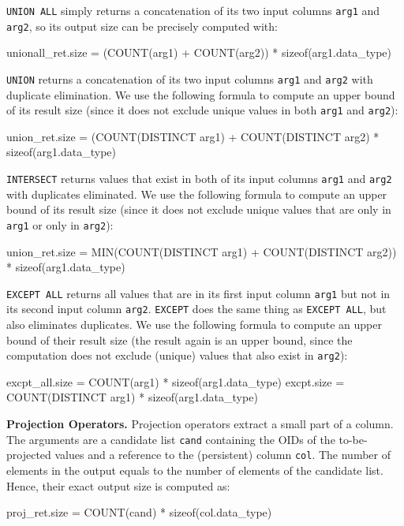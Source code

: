 \documentclass[conference]{IEEEtran}
\def\Skip{\par\medskip\nobreak\noindent}
\begin{document}
\texttt{\small UNION ALL} simply returns a concatenation of its two input columns \texttt{\small arg1} and \texttt{\small arg2}, so its output size can be precisely computed with:
\begin{verb}
unionall_ret.size = (COUNT(arg1) + COUNT(arg2)) * 
  sizeof(arg1.data_type)
\end{verb}

\texttt{\small UNION} returns a concatenation of its two input columns \texttt{\small arg1} and \texttt{\small arg2} with duplicate elimination.
We use the following formula to compute an upper bound of its result size (since it does not exclude unique values in both \texttt{\small arg1} and \texttt{\small arg2}):
\begin{verb}
union_ret.size = (COUNT(DISTINCT arg1) + 
  COUNT(DISTINCT arg2) * sizeof(arg1.data_type)
\end{verb}

\texttt{\small INTERSECT} returns values that exist in both of its input columns \texttt{\small arg1} and \texttt{\small arg2} with duplicates eliminated.
We use the following formula to compute an upper bound of its result size (since it does not exclude unique values that are only in \texttt{\small arg1} or only in \texttt{\small arg2}):
\begin{verb}
union_ret.size = MIN(COUNT(DISTINCT arg1) + 
  COUNT(DISTINCT arg2)) * sizeof(arg1.data_type)
\end{verb}

\texttt{\small EXCEPT ALL} returns all values that are in its first input column \texttt{\small arg1} but not in its second input column \texttt{\small arg2}.
\texttt{\small EXCEPT} does the same thing as \texttt{\small EXCEPT ALL}, but also eliminates duplicates.
We use the following formula to compute an upper bound of their result size (the result again is an upper bound, since the computation does not exclude (unique) values that also exist in \texttt{\small arg2}):
\begin{verb}
excpt_all.size = COUNT(arg1) * sizeof(arg1.data_type)
excpt.size = COUNT(DISTINCT arg1) * sizeof(arg1.data_type)
\end{verb}

\Skip\textbf{Projection Operators.}
Projection operators extract a small part of a column.
The arguments are a candidate list \texttt{\small cand} containing the OIDs of the to-be-projected values and a reference to the (persistent) column \texttt{\small col}.
The number of elements in the output equals to the number of elements of the candidate list.%
Hence, their exact output size is computed as:
\begin{verb}
proj_ret.size = COUNT(cand) * sizeof(col.data_type)
\end{verb}
\end{document}
